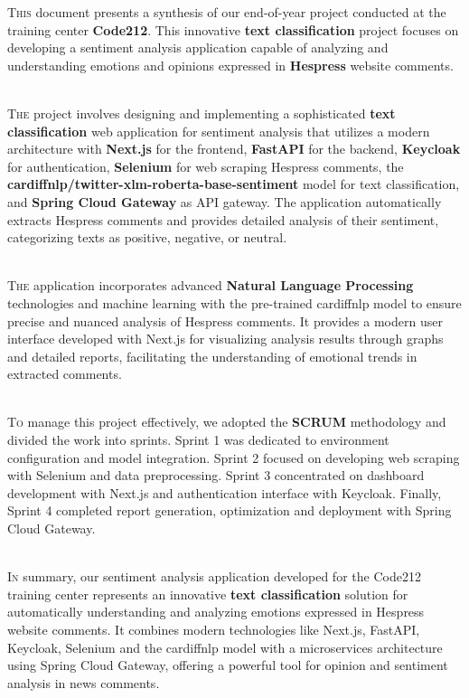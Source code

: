 
\lettrine[nindent=0em, slope=.5em] {\color{Eblue}T}{his} document presents a synthesis of our end-of-year project conducted at the training center \textbf{Code212}. This innovative \textbf{text classification} project focuses on developing a sentiment analysis application capable of analyzing and understanding emotions and opinions expressed in \textbf{Hespress} website comments.

\ \\

\lettrine[nindent=0em, slope=.5em] {\color{Eblue}T}{he} project involves designing and implementing a sophisticated \textbf{text classification} web application for sentiment analysis that utilizes a modern architecture with \textbf{Next.js} for the frontend, \textbf{FastAPI} for the backend, \textbf{Keycloak} for authentication, \textbf{Selenium} for web scraping Hespress comments, the \textbf{cardiffnlp/twitter-xlm-roberta-base-sentiment} model for text classification, and \textbf{Spring Cloud Gateway} as API gateway. The application automatically extracts Hespress comments and provides detailed analysis of their sentiment, categorizing texts as positive, negative, or neutral.

\ \\

\lettrine[nindent=0em, slope=.5em] {\color{Eblue}T}{he} application incorporates advanced \textbf{Natural Language Processing} technologies and machine learning with the pre-trained cardiffnlp model to ensure precise and nuanced analysis of Hespress comments. It provides a modern user interface developed with Next.js for visualizing analysis results through graphs and detailed reports, facilitating the understanding of emotional trends in extracted comments.

\ \\

\lettrine[nindent=0em, slope=.5em] {\color{Eblue}T}{o} manage this project effectively, we adopted the \textbf{SCRUM} methodology and divided the work into sprints. Sprint 1 was dedicated to environment configuration and model integration. Sprint 2 focused on developing web scraping with Selenium and data preprocessing. Sprint 3 concentrated on dashboard development with Next.js and authentication interface with Keycloak. Finally, Sprint 4 completed report generation, optimization and deployment with Spring Cloud Gateway.

\ \\

\lettrine[nindent=0em, slope=.5em] {\color{Eblue}I}{n} summary, our sentiment analysis application developed for the Code212 training center represents an innovative \textbf{text classification} solution for automatically understanding and analyzing emotions expressed in Hespress website comments. It combines modern technologies like Next.js, FastAPI, Keycloak, Selenium and the cardiffnlp model with a microservices architecture using Spring Cloud Gateway, offering a powerful tool for opinion and sentiment analysis in news comments.

